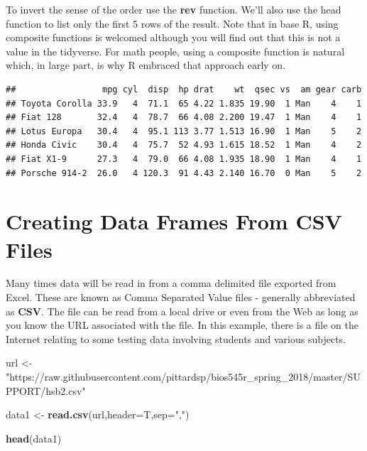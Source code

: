 \documentclass[]{book}
\newenvironment{Shaded}{\begin{snugshade}}{\end{snugshade}}
\newcommand{\KeywordTok}[1]{\textcolor[rgb]{0.13,0.29,0.53}{\textbf{#1}}}
\newcommand{\DataTypeTok}[1]{\textcolor[rgb]{0.13,0.29,0.53}{#1}}
\newcommand{\StringTok}[1]{\textcolor[rgb]{0.31,0.60,0.02}{#1}}
\newcommand{\OperatorTok}[1]{\textcolor[rgb]{0.81,0.36,0.00}{\textbf{#1}}}
\newcommand{\NormalTok}[1]{#1}
\begin{document}
To invert the sense of the order use the \textbf{rev} function. We'll
also use the head function to list only the first 5 rows of the result.
Note that in base R, using composite functions is welcomed although you
will find out that this is not a value in the tidyverse. For math
people, using a composite function is natural which, in large part, is
why R embraced that approach early on.

\begin{Shaded}
\end{Shaded}

\begin{verbatim}
##                 mpg cyl  disp  hp drat    wt  qsec vs  am gear carb
## Toyota Corolla 33.9   4  71.1  65 4.22 1.835 19.90  1 Man    4    1
## Fiat 128       32.4   4  78.7  66 4.08 2.200 19.47  1 Man    4    1
## Lotus Europa   30.4   4  95.1 113 3.77 1.513 16.90  1 Man    5    2
## Honda Civic    30.4   4  75.7  52 4.93 1.615 18.52  1 Man    4    2
## Fiat X1-9      27.3   4  79.0  66 4.08 1.935 18.90  1 Man    4    1
## Porsche 914-2  26.0   4 120.3  91 4.43 2.140 16.70  0 Man    5    2
\end{verbatim}

\section{Creating Data Frames From CSV
Files}\label{creating-data-frames-from-csv-files}

Many times data will be read in from a comma delimited file exported
from Excel. These are known as Comma Separated Value files - generally
abbreviated as \textbf{CSV}. The file can be read from a local drive or
even from the Web as long as you know the URL associated with the file.
In this example, there is a file on the Internet relating to some
testing data involving students and various subjects.

\begin{Shaded}
\begin{Highlighting}[]
\NormalTok{url <-}\StringTok{ "https://raw.githubusercontent.com/pittardsp/bios545r_spring_2018/master/SUPPORT/hsb2.csv"}

\NormalTok{data1 <-}\StringTok{ }\KeywordTok{read.csv}\NormalTok{(url,}\DataTypeTok{header=}\NormalTok{T,}\DataTypeTok{sep=}\StringTok{","}\NormalTok{)}

\KeywordTok{head}\NormalTok{(data1)}
\end{Highlighting}
\end{Shaded}
\end{document}
